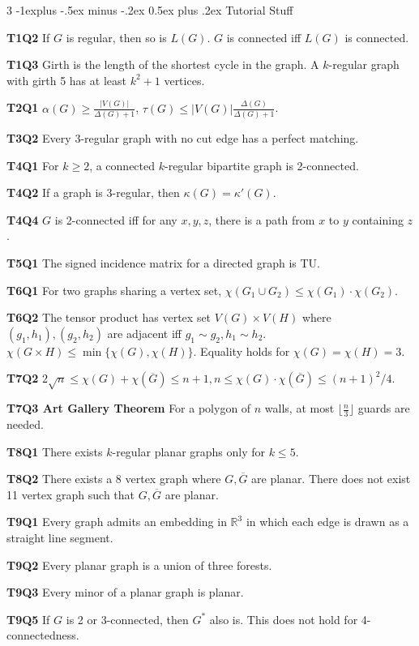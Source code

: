 \documentclass[10pt, landscape]{article}
\makeatletter
\renewcommand{\section}{\@startsection{section}{1}{0mm}%
                                {-1ex plus -.5ex minus -.2ex}%
                                {0.5ex plus .2ex}%
                                {\normalfont\large\bfseries}}
\renewcommand{\section}{\@startsection{section}{2}{0mm}%
                                {-1explus -.5ex minus -.2ex}%
                                {0.5ex plus .2ex}%
                                {\normalfont\normalsize\bfseries}}
\makeatother
\begin{document}
\begin{multicols*}{3}
\section{Tutorial Stuff}

\textbf{T1Q2} If $G$ is regular, then so is $L(G)$. $G$ is connected iff $L(G)$ is connected.

\textbf{T1Q3} Girth is the length of the shortest cycle in the graph. A $k$-regular graph with girth 5 has at least $k^2+1$ vertices.

\textbf{T2Q1} $\alpha(G) \geq \frac{|V(G)|}{\Delta(G)+1}$, $\tau(G) \leq |V(G)|\frac{\Delta(G)}{\Delta(G)+1}$.

\textbf{T3Q2} Every $3$-regular graph with no cut edge has a perfect matching.

\textbf{T4Q1} For $k \geq 2$, a connected $k$-regular bipartite graph is 2-connected.

\textbf{T4Q2} If a graph is 3-regular, then $\kappa(G)=\kappa'(G)$.

\textbf{T4Q4} $G$ is 2-connected iff for any $x,y,z$, there is a path from $x$ to $y$ containing $z$.

\textbf{T5Q1} The signed incidence matrix for a directed graph is TU.

\textbf{T6Q1} For two graphs sharing a vertex set, $\chi(G_1 \cup G_2) \leq \chi(G_1) \cdot \chi(G_2)$.

\textbf{T6Q2} The tensor product has vertex set $V(G) \times V(H)$ where $(g_1,h_1), (g_2,h_2)$ are adjacent iff $g_1 \sim g_2, h_1 \sim h_2$. $\chi(G \times H) \leq \min\{\chi(G), \chi(H)\}$. Equality holds for $\chi(G)=\chi(H)=3$.

\textbf{T7Q2} $2\sqrt{n} \leq \chi(G) + \chi(\overline{G})\leq n+1, n \leq \chi(G) \cdot \chi(\overline{G}) \leq (n+1)^2/4$.

\textbf{T7Q3 Art Gallery Theorem} For a polygon of $n$ walls, at most $\lfloor \frac{n}{3} \rfloor$ guards are needed.

\textbf{T8Q1} There exists $k$-regular planar graphs only for $k \leq 5$.

\textbf{T8Q2} There exists a 8 vertex graph where $G, \overline{G}$ are planar. There does not exist 11 vertex graph such that $G, \overline{G}$ are planar.

\textbf{T9Q1} Every graph admits an embedding in $\mathbb{R}^3$ in which each edge is drawn as a straight line segment.

\textbf{T9Q2} Every planar graph is a union of three forests.

\textbf{T9Q3} Every minor of a planar graph is planar.

\textbf{T9Q5} If $G$ is 2 or 3-connected, then $G^*$ also is. This does not hold for 4-connectedness.

\end{multicols*}
\end{document}
